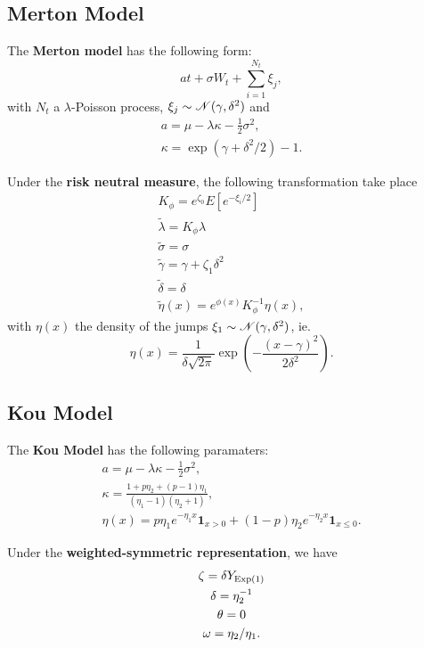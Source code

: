 \documentclass[10pt]{article}
\begin{document}
\subsection{Merton Model}
\begin{outline}
  \1 The \textbf{Merton model} has the following form:
  \begin{equation*}
    at + \sigma W_t + \sum_{i=1}^{N_t} \xi_j,
  \end{equation*}
  with $N_t$ a $\lambda$-Poisson process, $\xi_j \sim \mathscr{N}(\gamma,\delta^2)$ and
  \begin{gather*}
    a = \mu -\lambda\kappa - \tfrac{1}{2}\sigma^2,\\
    \kappa=  \exp(\gamma+\delta^2/2) - 1.
  \end{gather*}

  \1 Under the \textbf{risk neutral measure}, the following transformation take place 
  \begin{gather*}
    K_\phi = e^{\zeta_0}E[e^{-\xi_i/2}]\\
    \tilde\lambda = K_\phi\lambda\\
    \tilde\sigma = \sigma\\
    \tilde\gamma = \gamma + \zeta_1\delta^2\\
    \tilde\delta = \delta\\
    \tilde\eta(x) = e^{\phi(x)}K_\phi^{-1}\eta(x),
  \end{gather*}
  with $\eta(x)$ the density of the jumps $\xi_1\sim\mathscr{N}(\gamma,\delta^2)$, ie.
  \begin{equation*}
    \eta(x) = \frac{1}{\delta\sqrt{2\pi}}\exp\left(-\frac{(x-\gamma)^2}{2\delta^2}\right).
  \end{equation*}
\end{outline}

\subsection{Kou Model}

\begin{outline}
  \1 The \textbf{Kou Model} has the following paramaters:
  \begin{gather*}
    a = \mu - \lambda\kappa - \tfrac{1}{2}\sigma^2,\\
    \kappa = \frac{1+p\eta_2+(p-1)\eta_1}{(\eta_1-1)(\eta_2+1)},\\
    \eta(x) = p\eta_1 e^{-\eta_1 x} \bm 1_{x>0} + (1-p)\eta_2 e^{-\eta_2x}\bm 1_{x\leq 0}.
  \end{gather*}

  \1 Under the \textbf{weighted-symmetric representation}, we have
  \begin{gather*}
    \zeta = \delta Y_{\operatorname{Exp}(1)}\\
    \delta = \eta_2^{-1}\\
    \theta = 0\\
    \omega = \eta_2/\eta_1.
  \end{gather*}
\end{outline}
\end{document}
